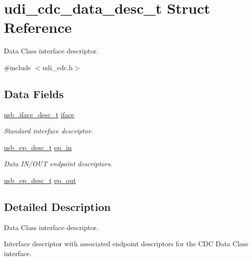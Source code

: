 \hypertarget{structudi__cdc__data__desc__t}{
\section{udi\-\_\-cdc\-\_\-data\-\_\-desc\-\_\-t \-Struct \-Reference}
\label{structudi__cdc__data__desc__t}
}


\-Data \-Class interface descriptor.  




{\ttfamily \#include $<$udi\-\_\-cdc.\-h$>$}

\subsection*{\-Data \-Fields}
\begin{DoxyCompactItemize}
\item 
\hyperlink{structusb__iface__desc__t}{usb\-\_\-iface\-\_\-desc\-\_\-t} \hyperlink{structudi__cdc__data__desc__t_a1c46d591be0f1fc12b6b79b43143c903}{iface}
\begin{DoxyCompactList}\small\item\em \-Standard interface descriptor. \end{DoxyCompactList}\item 
\hyperlink{structusb__ep__desc__t}{usb\-\_\-ep\-\_\-desc\-\_\-t} \hyperlink{structudi__cdc__data__desc__t_af219d67a67805d90e0c5064dd4ab2c29}{ep\-\_\-in}
\begin{DoxyCompactList}\small\item\em \-Data \-I\-N/\-O\-U\-T endpoint descriptors. \end{DoxyCompactList}\item 
\hyperlink{structusb__ep__desc__t}{usb\-\_\-ep\-\_\-desc\-\_\-t} \hyperlink{structudi__cdc__data__desc__t_a0be1a0edc207babda9677cbf34ac29c4}{ep\-\_\-out}
\end{DoxyCompactItemize}


\subsection{\-Detailed \-Description}
\-Data \-Class interface descriptor. 

\-Interface descriptor with associated endpoint descriptors for the \-C\-D\-C \-Data \-Class interface. 

